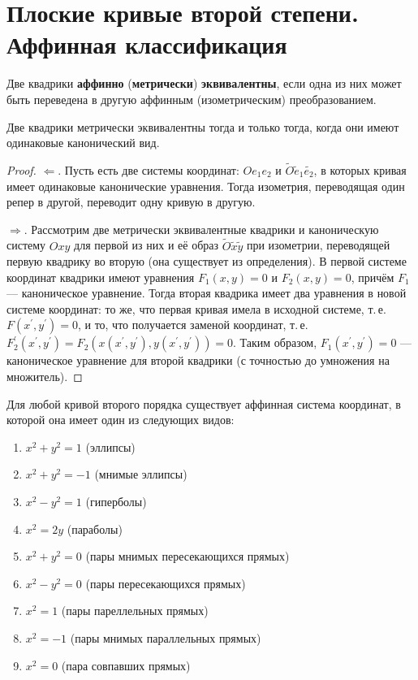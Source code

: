 \section{Плоские кривые второй степени. Аффинная классификация}

\begin{definition}
    Две квадрики \textbf{аффинно} (\textbf{метрически}) \textbf{эквивалентны}, если одна из них может быть переведена в другую аффинным (изометрическим) преобразованием.
\end{definition}

\begin{theorem}
    Две квадрики метрически эквивалентны тогда и только тогда, когда они имеют одинаковые канонический вид.
\end{theorem}

\begin{proof}
    $\Leftarrow$. Пусть есть две системы координат: $Oe_1e_2$ и $\widetilde{O}\widetilde{e}_1\widetilde{e_2}$, в которых кривая имеет одинаковые канонические уравнения. Тогда изометрия, переводящая один репер в другой, переводит одну кривую в другую.

    $\Rightarrow$. Рассмотрим две метрически эквивалентные квадрики и каноническую систему $Oxy$ для первой из них и её образ $\widetilde{O}\widetilde{x}\widetilde{y}$ при изометрии, переводящей первую квадрику во вторую (она существует из определения). В первой системе координат квадрики имеют уравнения $F_1(x, y) = 0$ и $F_2(x, y) = 0$, причём $F_1$ --- каноническое уравнение. Тогда вторая квадрика имеет два уравнения в новой системе координат: то же, что первая кривая имела в исходной системе, т.\,е. $F(x^\prime, y^\prime) = 0$, и то, что получается заменой координат, т.\,е. $F_2^\prime(x^\prime, y^\prime) = F_2(x(x^\prime, y^\prime), y(x^\prime, y^\prime)) = 0$. Таким образом, $F_1(x^\prime, y^\prime) = 0$ --- каноническое уравнение для второй квадрики (с точностью до умножения на множитель).
\end{proof}

\begin{lemma}
   Для любой кривой второго порядка существует аффинная система координат, в которой она имеет один из следующих видов:
    \begin{enumerate}
        \item $x^2 + y^2 = 1$ (эллипсы)
        \item $x^2 + y^2 = -1$ (мнимые эллипсы)
        \item $x^2 - y^2 = 1$ (гиперболы)
        \item $x^2 = 2y$ (параболы)
        \item $x^2 + y^2 = 0$ (пары мнимых пересекающихся прямых)
        \item $x^2 - y^2 = 0$ (пары пересекающихся прямых)
        \item $x^2 = 1$ (пары пареллельных прямых)
        \item $x^2 = -1$ (пары мнимых параллельных прямых)
        \item $x^2 = 0$ (пара совпавших прямых)
    \end{enumerate}
\end{lemma}

